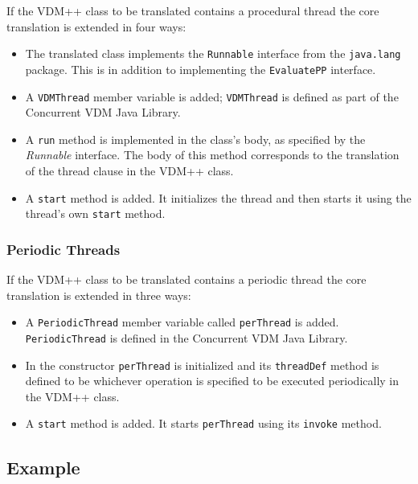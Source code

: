 \documentclass[\pformat,11pt]{article}
\newcommand{\VDM}{VDM++}
\newcommand{\CJL}{Concurrent VDM Java Library}
\begin{document}
If the \VDM{} class to be translated contains a procedural thread the
core translation is extended in four ways: 
\begin{itemize}
\item The translated class implements the \texttt{Runnable} interface
  from the \texttt{java.lang} package. This is in addition to
  implementing the \texttt{EvaluatePP} interface.
\item A \texttt{VDMThread} member variable is added; \texttt{VDMThread} is
  defined as part of the \CJL.
\item A \texttt{run} method is implemented in the class's body, as
  specified by the \textit{Runnable} interface. The body of this
  method corresponds to the translation of the \textsf{thread} clause
  in the \VDM{} class.
\item A \texttt{start} method is added. It initializes the thread and then
  starts it using the thread's own \texttt{start} method.
\end{itemize}

\subsubsection{Periodic Threads}
If the \VDM{} class to be translated contains a periodic thread the
core translation is extended in three ways: 
\begin{itemize}
\item A \texttt{PeriodicThread} member variable called
  \texttt{perThread} is added. \texttt{PeriodicThread} is defined in
  the \CJL. 
\item In the constructor \texttt{perThread} is initialized and its
  \texttt{threadDef} method is defined to be whichever operation is
  specified to be executed periodically in the \VDM{} class.
\item A \texttt{start} method is added. It starts \texttt{perThread} using its
  \texttt{invoke} method.
\end{itemize}


\subsection{Example}
\end{document}
